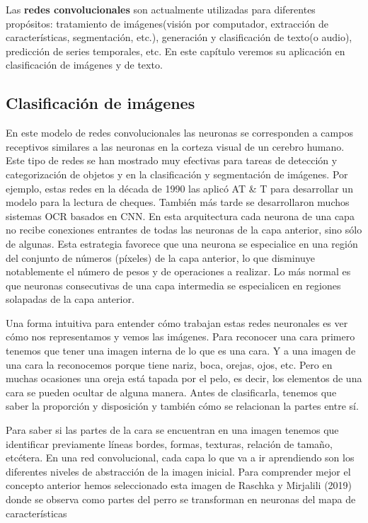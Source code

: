 \documentclass[
  a4paper,
  DIV=11,
  numbers=noendperiod]{scrreprt}
\begin{document}
Las \textbf{redes convolucionales} son actualmente utilizadas para
diferentes propósitos: tratamiento de imágenes(visión por computador,
extracción de características, segmentación, etc.), generación y
clasificación de texto(o audio), predicción de series temporales, etc.
En este capítulo veremos su aplicación en clasificación de imágenes y de
texto.

\subsection{Clasificación de
imágenes}\label{clasificaciuxf3n-de-imuxe1genes}

En este modelo de redes convolucionales las neuronas se corresponden a
campos receptivos similares a las neuronas en la corteza visual de un
cerebro humano. Este tipo de redes se han mostrado muy efectivas para
tareas de detección y categorización de objetos y en la clasificación y
segmentación de imágenes. Por ejemplo, estas redes en la década de 1990
las aplicó AT \& T para desarrollar un modelo para la lectura de
cheques. También más tarde se desarrollaron muchos sistemas OCR basados
en CNN. En esta arquitectura cada neurona de una capa no recibe
conexiones entrantes de todas las neuronas de la capa anterior, sino
sólo de algunas. Esta estrategia favorece que una neurona se especialice
en una región del conjunto de números (píxeles) de la capa anterior, lo
que disminuye notablemente el número de pesos y de operaciones a
realizar. Lo más normal es que neuronas consecutivas de una capa
intermedia se especialicen en regiones solapadas de la capa anterior.

Una forma intuitiva para entender cómo trabajan estas redes neuronales
es ver cómo nos representamos y vemos las imágenes. Para reconocer una
cara primero tenemos que tener una imagen interna de lo que es una cara.
Y a una imagen de una cara la reconocemos porque tiene nariz, boca,
orejas, ojos, etc. Pero en muchas ocasiones una oreja está tapada por el
pelo, es decir, los elementos de una cara se pueden ocultar de alguna
manera. Antes de clasificarla, tenemos que saber la proporción y
disposición y también cómo se relacionan la partes entre sí.

Para saber si las partes de la cara se encuentran en una imagen tenemos
que identificar previamente líneas bordes, formas, texturas, relación de
tamaño, etcétera. En una red convolucional, cada capa lo que va a ir
aprendiendo son los diferentes niveles de abstracción de la imagen
inicial. Para comprender mejor el concepto anterior hemos seleccionado
esta imagen de Raschka y Mirjalili (2019) donde se observa como partes
del perro se transforman en neuronas del mapa de características
\end{document}
